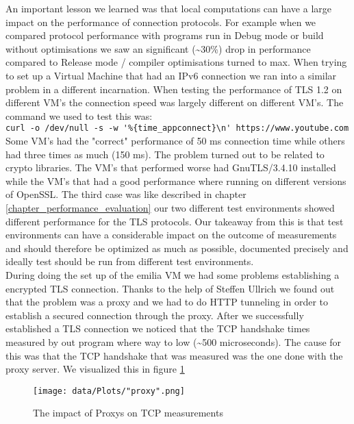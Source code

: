 An important lesson we learned was that local computations can have a large impact on the performance of connection protocols.
For example when we compared protocol performance with programs run in Debug mode or build without optimisations we saw an significant (\textasciitilde 30\%) drop in performance compared to Release mode / compiler optimisations turned to max.
When trying to set up a Virtual Machine that had an IPv6 connection we ran into a similar problem in a different incarnation.
When testing the performance of TLS 1.2 on different VM's the connection speed was largely different on different VM's.
The command we used to test this was:\\
\verb|curl -o /dev/null -s -w '%{time_appconnect}\n' https://www.youtube.com|\\
Some VM's had the "correct" performance of 50 ms connection time while others had three times as much (150 ms).
The problem turned out to be related to crypto libraries.
The VM's that performed worse had  GnuTLS/3.4.10 installed  while the VM's that had a good performance where running on different versions of OpenSSL.
The third case was like described in chapter \ref{chapter_performance_evaluation} our two different test environments showed different performance for the TLS protocols.
Our takeaway from this is that test environments can have a considerable impact on the outcome of measurements and should therefore be optimized as much as possible, documented precisely and ideally test should be run from different test environments.\\

During doing the set up of the emilia VM we had some problems establishing a encrypted TLS connection.
Thanks to the help of Steffen Ullrich \cite{Link:httpTunnel} we found out that the problem was a proxy and we had to do HTTP tunneling in order to establish a secured connection through the proxy.
After we successfully established a TLS connection we noticed that the TCP handshake times measured by out program where way to low (\textasciitilde 500 microseconds).
The cause for this was that the TCP handshake that was measured was the one done with the proxy server.
We visualized this in figure \ref{fig:Proxy}\\

\begin{figure}[!thb]
	\centering
	\texttt{[image: data/Plots/"proxy".png]}
	\caption{The impact of Proxys on TCP measurements}
  	\label{fig:Proxy}
\end{figure}

